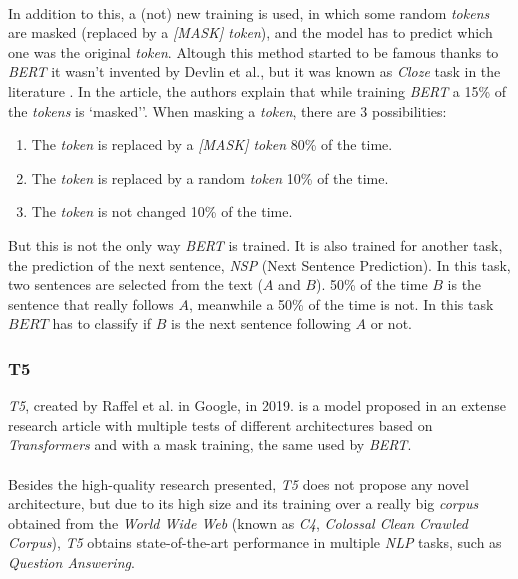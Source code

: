 \paragraph{}
In addition to this, a (not) new training is used, in which some random \emph{tokens} are masked (replaced by a \emph{[MASK] token}), and the model has to predict which one was the original \emph{token}. Altough this method started to be famous thanks to \emph{BERT} it wasn't invented by Devlin et al., but it was known as \emph{Cloze} task in the literature \cite{Taylor1953}. In the article, the authors explain that while training \emph{BERT} a 15\% of the \emph{tokens} is `masked''. When masking a \emph{token}, there are 3 possibilities:
\begin{enumerate}
\item The \emph{token} is replaced by a \emph{[MASK] token} 80\% of the time.
\item The \emph{token} is replaced by a random \emph{token} 10\% of the time.
\item The \emph{token} is not changed 10\% of the time.
\end{enumerate}
But this is not the only way \emph{BERT} is trained. It is also trained for another task, the prediction of the next sentence, \emph{NSP} (Next Sentence Prediction). In this task, two sentences are selected from the text ($A$ and $B$). 50\% of the time $B$ is the sentence that really follows $A$, meanwhile a 50\% of the time is not. In this task $BERT$ has to classify if $B$ is the next sentence following $A$ or not. 
\subsubsection{T5}
\noindent \emph{T5}, created by Raffel et al. in Google, in 2019.\cite{Raffel2019} is a model proposed in an extense research article with multiple tests of different architectures based on \emph{Transformers} and with a mask training, the same used by \emph{BERT}.
\paragraph{}
Besides the high-quality research presented, \emph{T5} does not propose any novel architecture, but due to its high size and its training over a really big \emph{corpus} obtained from the \emph{World Wide Web} (known as \emph{C4}, \emph{Colossal Clean Crawled Corpus}), \emph{T5} obtains state-of-the-art performance in multiple \emph{NLP} tasks, such as \emph{Question Answering}.
